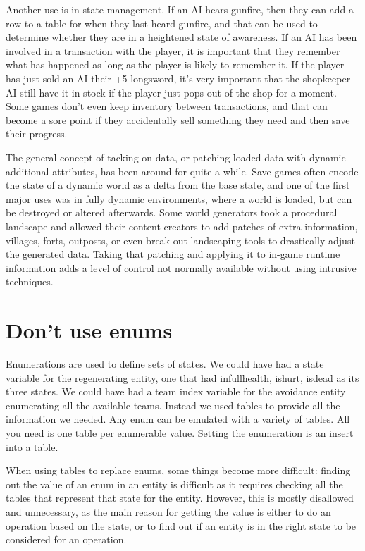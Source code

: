 Another use is in state management. If an AI hears gunfire, then they can add a
row to a table for when they last heard gunfire, and that can be used to
determine whether they are in a heightened state of awareness. If an AI has
been involved in a transaction with the player, it is important that they
remember what has happened as long as the player is likely to remember it. If
the player has just sold an AI their +5 longsword, it's very important that the
shopkeeper AI still have it in stock if the player just pops out of the shop
for a moment. Some games don't even keep inventory between transactions, and
that can become a sore point if they accidentally sell something they need and
then save their progress.

The general concept of tacking on data, or patching loaded data with dynamic
additional attributes, has been around for quite a while. Save games often
encode the state of a dynamic world as a delta from the base state, and one of
the first major uses was in fully dynamic environments, where a world is
loaded, but can be destroyed or altered afterwards. Some world generators took
a procedural landscape and allowed their content creators to add patches of
extra information, villages, forts, outposts, or even break out landscaping
tools to drastically adjust the generated data. Taking that patching and
applying it to in-game runtime information adds a level of control not normally
available without using intrusive techniques.

\section{Don't use enums}\label{sec:exist-enum}

Enumerations are used to define sets of states. We could have had a state
variable for the regenerating entity, one that had infullhealth, ishurt, isdead
as its three states. We could have had a team index variable for the avoidance
entity enumerating all the available teams. Instead we used tables to provide
all the information we needed. Any enum can be emulated with a variety of
tables. All you need is one table per enumerable value. Setting the enumeration
is an insert into a table.

When using tables to replace enums, some things become more difficult: finding
out the value of an enum in an entity is difficult as it requires checking all
the tables that represent that state for the entity. However, this is mostly
disallowed and unnecessary, as the main reason for getting the value is either
to do an operation based on the state, or to find out if an entity is in the
right state to be considered for an operation.

